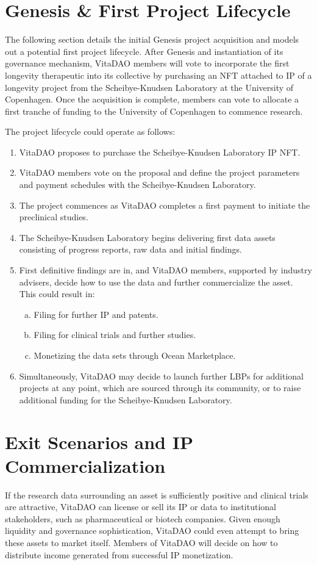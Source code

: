 \documentclass[12pt,letterpaper]{article}
\begin{document}
\section{Genesis \& First Project Lifecycle}
The following section details the initial Genesis project acquisition and models out a potential first project lifecycle. After Genesis and instantiation of its governance mechanism, VitaDAO members will vote to incorporate the first longevity therapeutic into its collective by purchasing an NFT attached to IP of a longevity project from the Scheibye-Knudsen Laboratory at the University of Copenhagen. Once the acquisition is complete, members can vote to allocate a first tranche of funding to the University of Copenhagen to commence research.

The project lifecycle could operate as follows:
\begin{enumerate}
\item VitaDAO proposes to purchase the Scheibye-Knudsen Laboratory IP NFT.
\item VitaDAO members vote on the proposal and define the project parameters and payment schedules with the Scheibye-Knudsen Laboratory.
\item The project commences as VitaDAO completes a first payment to initiate the preclinical studies.
\item The Scheibye-Knudsen Laboratory begins delivering first data assets consisting of progress reports, raw data and initial findings.
\item First definitive findings are in, and VitaDAO members, supported by industry advisers, decide how to use the data and further commercialize the asset. This could result in:
\begin{enumerate}[a.]
\item Filing for further IP and patents.
\item Filing for clinical trials and further studies.
\item Monetizing the data sets through Ocean Marketplace.
\end{enumerate}
\item Simultaneously, VitaDAO may decide to launch further LBPs for additional projects at any point, which are sourced through its community, or to raise additional funding for the Scheibye-Knudsen Laboratory.
\end{enumerate}

\section{Exit Scenarios and IP Commercialization}
If the research data surrounding an asset is sufficiently positive and clinical trials are attractive, VitaDAO can license or sell its IP or data to institutional stakeholders, such as pharmaceutical or biotech companies. Given enough liquidity and governance sophistication, VitaDAO could even attempt to bring these assets to market itself. Members of VitaDAO will decide on how to distribute income generated from successful IP monetization.
\end{document}

